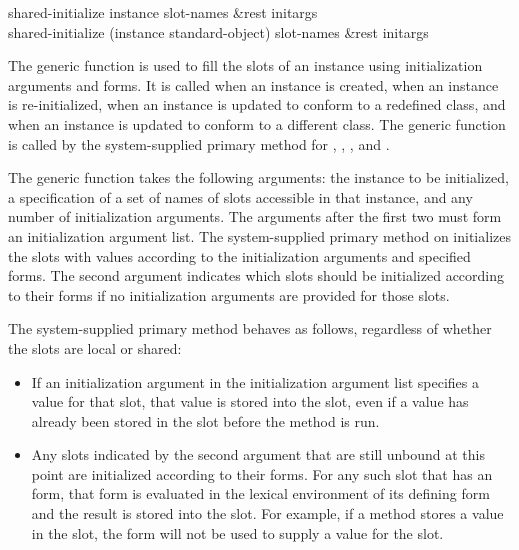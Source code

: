 \begin{defun}
shared-initialize instance slot-names &rest initargs \\
shared-initialize (instance standard-object) slot-names &rest initargs

The generic function  is used to fill the slots
of an instance using initialization arguments and 
forms.  It is called when an instance is created, when an instance is
re-initialized, when an instance is updated to conform to a redefined
class, and when an instance is updated to conform to a different
class.  The generic function  is called by the
system-supplied primary method for , 
,
, and
.

The generic function  takes the following
arguments: the instance to be initialized, a specification of a set of
names of slots accessible in that instance, and any number of initialization
arguments.  The arguments after the first two must form an initialization
argument list.  The system-supplied primary method on 
 initializes the slots with values according to the
initialization arguments and specified  forms.  The
second argument indicates which slots should be initialized according
to their  forms if no initialization arguments are
provided for those slots. 

The system-supplied primary method behaves as follows, regardless of
whether the slots are local or shared: 

\begin{itemize}

\item  If an initialization argument in the
initialization argument list specifies a value for that slot, that
value is stored into the slot,  even if a value has
already been stored in the slot before the method is run.

\item  Any slots indicated by the second argument that are still
unbound at this point are initialized according to their 
 forms.  For any such slot that has an  form,
that form is evaluated in the lexical environment of its defining 
 form and the result is stored into the slot.  For example, if
a  method stores a value in the slot, the 
form will not be used to supply a value for the slot.


\end{itemize}
\end{defun}
